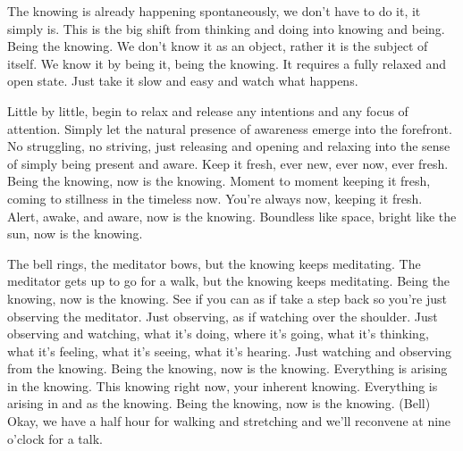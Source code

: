 \documentclass[12pt,openany]{book}
\begin{document}
The knowing is already happening spontaneously, we don't have to do it, it simply is. This is the big shift from thinking and doing into knowing and being. Being the knowing. We don't know it as an object, rather it is the subject of itself. We know it by being it, being the knowing. It requires a fully relaxed and open state. Just take it slow and easy and watch what happens.

Little by little, begin to relax and release any intentions and any focus of attention. Simply let the natural presence of awareness emerge into the forefront. No struggling, no striving, just releasing and opening and relaxing into the sense of simply being present and aware. Keep it fresh, ever new, ever now, ever fresh. Being the knowing, now is the knowing. Moment to moment keeping it fresh, coming to stillness in the timeless now. You’re always now, keeping it fresh. Alert, awake, and aware, now is the knowing. Boundless like space, bright like the sun, now is the knowing.

The bell rings, the meditator bows, but the knowing keeps meditating. The meditator gets up to go for a walk, but the knowing keeps meditating. Being the knowing, now is the knowing. See if you can as if take a step back so you're just observing the meditator. Just observing, as if watching over the shoulder. Just observing and watching, what it's doing, where it's going, what it's thinking, what it's feeling, what it's seeing, what it's hearing. Just watching and observing from the knowing. Being the knowing, now is the knowing. Everything is arising in the knowing. This knowing right now, your inherent knowing. Everything is arising in and as the knowing. Being the knowing, now is the knowing. (Bell) Okay, we have a half hour for walking and stretching and we’ll reconvene at nine o'clock for a talk.

\begin{figure}[h]
    \centering
\end{figure}
\end{document}
